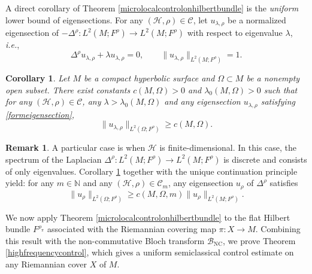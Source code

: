 \documentclass[11pt,oneside,reqno]{amsart}
\newcommand\N{\ensuremath{\mathbb{N}}}
\newtheorem{theorem}{Theorem}[section]
\newtheorem{corollary}[theorem]{Corollary}
\theoremstyle{definition}
\newtheorem{remark}[definition]{Remark}
\numberwithin{equation}{section}
\theoremstyle{plain}
\begin{document}
A direct corollary of Theorem \ref{microlocalcontrolonhilbertbundle} is the \emph{uniform} lower bound of eigensections. For any $(\mathcal{H},\rho)\in \mathcal{C}$, let $u_{\lambda,\rho}$ be a normalized eigensection of $-\Delta^{\rho}: L^2(M;F^\rho)\to L^2(M;F^{\rho})$ with respect to eigenvalue $\lambda$, \emph{i.e.},
\begin{equation}\label{formeigensection}
    \Delta^\rho u_{\lambda,\rho}  +\lambda  u_{\lambda,\rho} =0, \qquad \|u_{\lambda,\rho}\|_{L^2(M;F^{\rho})}=1.
\end{equation}

\begin{corollary}\label{controlofeigensection}
Let $M$ be a compact hyperbolic surface and $\Omega \subset M$ be a nonempty open subset. There exist constants $c(M,\Omega)>0$ and $\lambda_{0}(M,\Omega)>0$ such that for any $(\mathcal{H},\rho)\in \mathcal{C}$, any $\lambda >\lambda_{0}(M,\Omega)$ and any eigensection $u_{\lambda,\rho} $ satisfying \eqref{formeigensection},
\begin{equation*}
\| u_{\lambda,\rho} \|_{L^2(\Omega; F^{\rho})}\geq c(M,\Omega) .
\end{equation*}
\end{corollary}

\begin{remark}
A particular case is when $\mathcal{H}$ is finite-dimensional. In this case, the spectrum of the Laplacian $\Delta^{\rho}: L^2(M;F^\rho)\to L^2(M;F^{\rho})$ is discrete and consists of only  eigenvalues. Corollary \ref{controlofeigensection} together with the unique continuation principle yield: for any $m \in \N$ and any $(\mathcal{H},\rho) \in \mathcal{C}_m$, any eigensection $u_\rho$ of $\Delta^\rho$ satisfies
\begin{equation*}
    \| u_\rho \|_{L^2(\Omega; F^{\rho})}\geq c(M,\Omega,m) \|u_\rho \|_{L^2(M;F^{\rho})}.
\end{equation*}
\end{remark}


We now apply Theorem \ref{microlocalcontrolonhilbertbundle} to the flat Hilbert bundle $F^{\rho_\pi}$ associated with the Riemannian covering map $\pi:X\to M$. Combining this result with the non-commutative Bloch transform $\mathcal{B}_{\mathrm{NC}}$, we prove Theorem \ref{highfrequencycontrol}, which gives a uniform semiclassical control estimate on any Riemannian cover $X$ of $M$.

\end{document}
